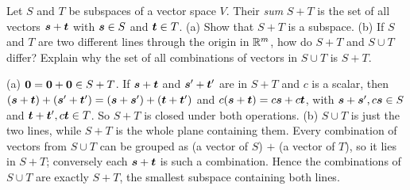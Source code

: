 \begin{exercise}\label{ex:u07-sum}
Let $S$ and $T$ be subspaces of a vector space $V$. Their \emph{sum} $S+T$ is the set of all
vectors $\boldsymbol{s}+\boldsymbol{t}$ with $\boldsymbol{s}\in S$ and $\boldsymbol{t}\in T$. (a) Show that $S+T$ is a subspace.
(b) If $S$ and $T$ are two different lines through the origin in $\mathbb{R}^m$, how do $S+T$ and
$S\cup T$ differ? Explain why the set of all combinations of vectors in $S\cup T$ is $S+T$.
\end{exercise}
\begin{solution}
(a) $\boldsymbol{0}=\boldsymbol{0}+\boldsymbol{0}\in S+T$. If $\boldsymbol{s}+\boldsymbol{t}$ and $\boldsymbol{s}'+\boldsymbol{t}'$ are in $S+T$ and $c$ is
a scalar, then $(\boldsymbol{s}+\boldsymbol{t})+(\boldsymbol{s}'+\boldsymbol{t}')=(\boldsymbol{s}+\boldsymbol{s}')+(\boldsymbol{t}+\boldsymbol{t}')$ and
$c(\boldsymbol{s}+\boldsymbol{t})=c\boldsymbol{s}+c\boldsymbol{t}$, with $\boldsymbol{s}+\boldsymbol{s}',c\boldsymbol{s}\in S$ and $\boldsymbol{t}+\boldsymbol{t}',c\boldsymbol{t}\in T$.
So $S+T$ is closed under both operations.
(b) $S\cup T$ is just the two lines, while $S+T$ is the whole plane containing them. Every
combination of vectors from $S\cup T$ can be grouped as (a vector of $S$) $+$ (a vector of
$T$), so it lies in $S+T$; conversely each $\boldsymbol{s}+\boldsymbol{t}$ is such a combination. Hence the
combinations of $S\cup T$ are exactly $S+T$, the smallest subspace containing both lines.
\end{solution}

